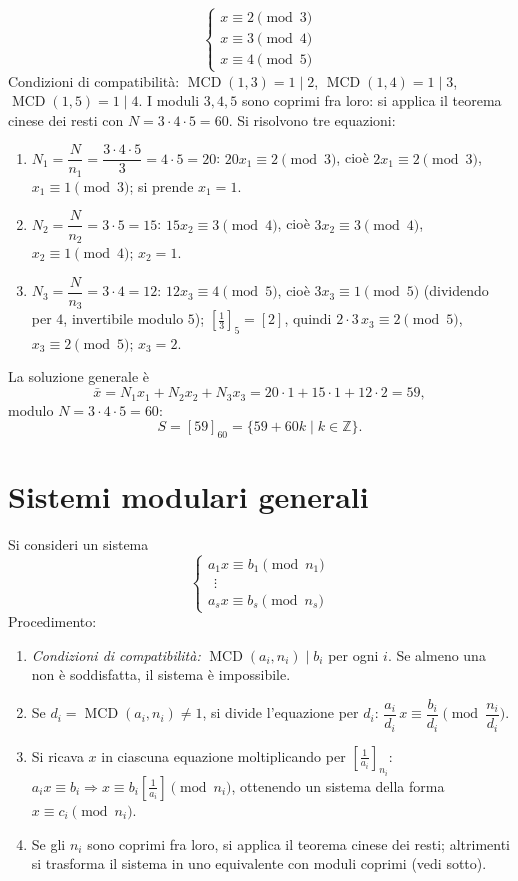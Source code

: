 \documentclass[11pt,a4paper]{article}
\begin{document}
\begin{esempio}
\[
  \begin{cases} x \equiv 2 \pmod 3 \\ x \equiv 3 \pmod 4 \\ x \equiv 4 \pmod 5 \end{cases}
\]
Condizioni di compatibilità: $\operatorname{MCD}(1, 3) = 1 \mid 2$, $\operatorname{MCD}(1, 4) = 1 \mid 3$, $\operatorname{MCD}(1, 5) = 1 \mid 4$. I moduli $3, 4, 5$ sono coprimi fra loro: si applica il teorema cinese dei resti con $N = 3\cdot 4\cdot 5 = 60$. Si risolvono tre equazioni:
\begin{enumerate}
  \item $N_1 = \dfrac{N}{n_1} = \dfrac{3\cdot 4\cdot 5}{3} = 4\cdot 5 = 20$: $20x_1 \equiv 2 \pmod 3$, cioè $2x_1 \equiv 2 \pmod 3$, $x_1 \equiv 1 \pmod 3$; si prende $x_1 = 1$.
  \item $N_2 = \dfrac{N}{n_2} = 3\cdot 5 = 15$: $15x_2 \equiv 3 \pmod 4$, cioè $3x_2 \equiv 3 \pmod 4$, $x_2 \equiv 1 \pmod 4$; $x_2 = 1$.
  \item $N_3 = \dfrac{N}{n_3} = 3\cdot 4 = 12$: $12x_3 \equiv 4 \pmod 5$, cioè $3x_3 \equiv 1 \pmod 5$ (dividendo per $4$, invertibile modulo $5$); $\left[\tfrac{1}{3}\right]_5 = [2]$, quindi $2\cdot 3\,x_3 \equiv 2 \pmod 5$, $x_3 \equiv 2 \pmod 5$; $x_3 = 2$.
\end{enumerate}
La soluzione generale è
\[
  \bar{x} = N_1x_1 + N_2x_2 + N_3x_3 = 20\cdot 1 + 15\cdot 1 + 12\cdot 2 = 59,
\]
modulo $N = 3\cdot 4\cdot 5 = 60$:
\[
  S = [59]_{60} = \{59 + 60k \mid k \in \mathbb{Z}\}.
\]
\end{esempio}

\section{Sistemi modulari generali}

Si consideri un sistema
\[
  \begin{cases} a_1x \equiv b_1 \pmod{n_1} \\ \ \ \vdots \\ a_sx \equiv b_s \pmod{n_s} \end{cases}
\]
Procedimento:
\begin{enumerate}
  \item \emph{Condizioni di compatibilità:} $\operatorname{MCD}(a_i, n_i) \mid b_i$ per ogni $i$. Se almeno una non è soddisfatta, il sistema è impossibile.
  \item Se $d_i = \operatorname{MCD}(a_i, n_i) \neq 1$, si divide l'equazione per $d_i$: $\dfrac{a_i}{d_i}\,x \equiv \dfrac{b_i}{d_i} \pmod{\dfrac{n_i}{d_i}}$.
  \item Si ricava $x$ in ciascuna equazione moltiplicando per $\left[\tfrac{1}{a_i}\right]_{n_i}$: $a_ix \equiv b_i \Rightarrow x \equiv b_i\left[\tfrac{1}{a_i}\right] \pmod{n_i}$, ottenendo un sistema della forma $x \equiv c_i \pmod{n_i}$.
  \item Se gli $n_i$ sono coprimi fra loro, si applica il teorema cinese dei resti; altrimenti si trasforma il sistema in uno equivalente con moduli coprimi (vedi sotto).
\end{enumerate}
\end{document}
